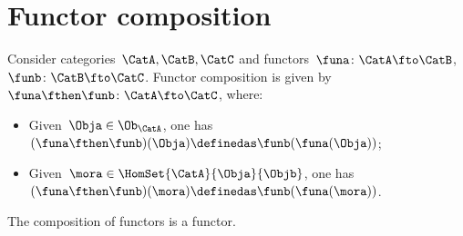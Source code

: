 
\section{Functor composition}

\begin{ctdefinition}
    \label{def:functor_composition}
    Consider categories~$\CatA,\CatB,\CatC$ and functors~$\funa\colon \CatA\fto \CatB$,~$\funb \colon \CatB\fto \CatC$.
    Functor composition is given by~$\funa\fthen \funb\colon \CatA \fto \CatC$, where:
    \begin{itemize}
        \item Given~$\Obja\in \Ob_\CatA$, one has~$(\funa\fthen \funb)(\Obja)\definedas\funb(\funa(\Obja))$;
        \item Given~$\mora \in \HomSet{\CatA}{\Obja}{\Objb}$, one has~$(\funa\fthen \funb)(\mora)\definedas \funb(\funa(\mora))$.
    \end{itemize}
\end{ctdefinition}

\begin{lemma}
    \label{lem:functors_compose}
    The composition of functors is a functor.
\end{lemma}

